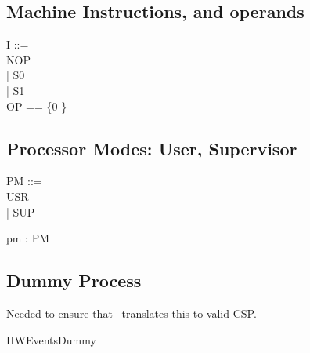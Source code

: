 \subsection{Machine Instructions, and operands} %
\begin{circus}
I ::=\\
  NOP\\   %
  | S0\\    %
  | S1\\    %

OP == \{0 \}
\end{circus}

\subsection{Processor Modes: User, Supervisor} %
\begin{circus}
PM ::=\\
 USR\\
 | SUP
\end{circus}

\begin{circus}
\circchannel pm : PM
\end{circus}

\subsection{Dummy Process}

Needed to ensure that \CTOC\ translates this to valid CSP.

\begin{circus}
\circprocess HWEventsDummy \circdef
\\ \circbegin
\\ \circspot
       \Skip
\\ \circend
\end{circus}
